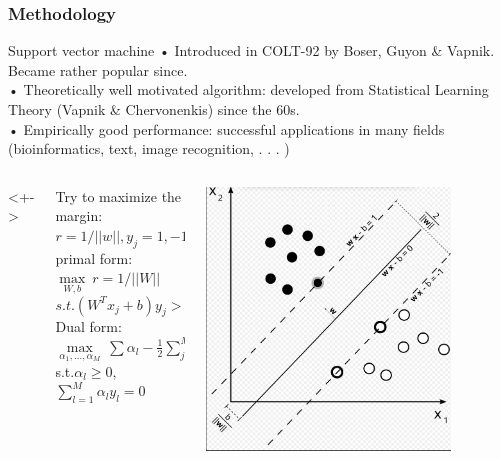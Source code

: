 \documentclass[xcolor={x11names,svgnames,dvipsnames}]{beamer}
\begin{document}
\begin{frame}
\frametitle{Methodology}
\begin{block}{Support vector machine}
{\small
• Introduced in COLT-92 by Boser, Guyon \& Vapnik. Became
rather popular since.\\
• Theoretically well motivated algorithm: developed from Statistical
Learning Theory (Vapnik \& Chervonenkis) since the 60s.\\
• Empirically good performance: successful applications in many
fields (bioinformatics, text, image recognition, . . . )\\
}
\end{block}

\begin{columns}<+->
\begin{column}{0.6\textwidth}
\small {
Try to maximize the margin:\\ 
$r=1/||w||,y_j=1,-1$\\
\alert{primal form}:\\
$\max\limits_{W,b}\ r= 1/||W||$\\
$s.t.(W^Tx_j+b)y_j>=1$\\
\alert{Dual form}:\\
$\max\limits_{\alpha_1,...,\alpha_M}\ \sum\alpha_l-\frac{1}{2}\sum_{j=1}^{M}\sum_{k=1}^{M}\alpha_j\alpha_k y_j y_k<X_j,X_k>$\\
s.t.$\alpha_l\geq 0$, $\sum_{l=1}^{M}\alpha_ly_l=0$
}
\end{column}
\begin{column}{.4\textwidth}
     \includegraphics[width=0.8\textwidth, height=0.4\textheight]{svm.png}
\end{column}
\end{columns}
\end{frame}
\end{document}
